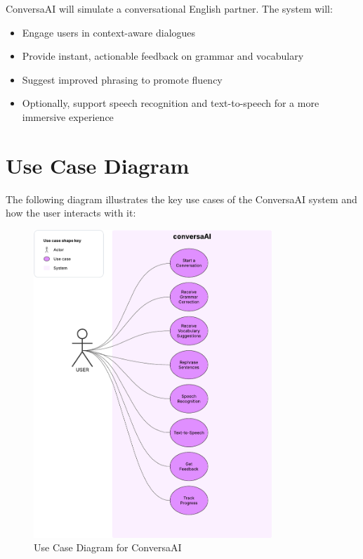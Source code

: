 \documentclass[12pt]{article}
\begin{document}
ConversaAI will simulate a conversational English partner. The system will:
\begin{itemize}
    \item Engage users in context-aware dialogues
    \item Provide instant, actionable feedback on grammar and vocabulary
    \item Suggest improved phrasing to promote fluency
    \item Optionally, support speech recognition and text-to-speech for a more immersive experience
\end{itemize}

\section*{Use Case Diagram}

The following diagram illustrates the key use cases of the ConversaAI system and how the user interacts with it:

\begin{figure}[h!]
    \centering
    \includegraphics[width=0.8\textwidth]{use_case_diag.pdf}
    \caption{Use Case Diagram for ConversaAI}
    \label{fig:use_case_diagram}
\end{figure}
\end{document}

